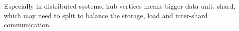 
Especially in distributed systems, hub vertices means bigger data unit, \eg
shard, which may need to split to balance the storage, load and inter-shard
communication.


